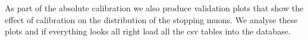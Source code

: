 \documentclass[12pt,a4paper]{article}
\begin{document}
As part of the absolute calibration we also produce validation plots that show the effect of calibration on the distribution of the stopping muons. We analyse these plots and if everything looks all right load all the csv tables into the database.

\end{document}
